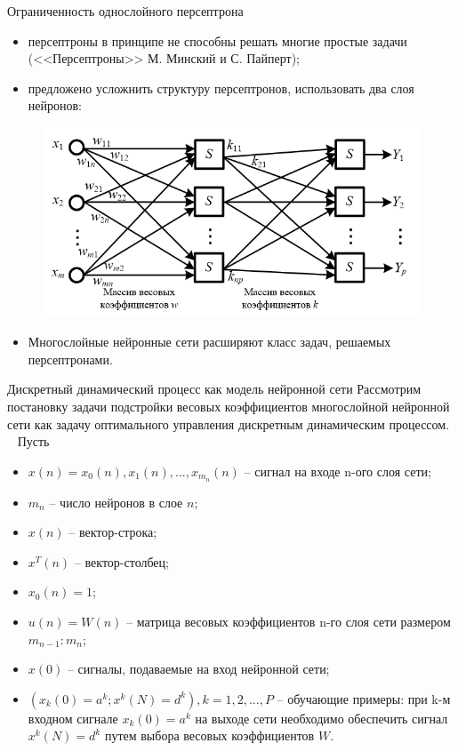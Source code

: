 \documentclass{beamer}
\begin{document}
\begin{frame}[t]{Ограниченность однослойного персептрона}
	\begin{itemize}
		\item персептроны в принципе не способны решать многие простые задачи (<<Персептроны>> М. Минский и С. Пайперт);
		\item предложено усложнить структуру персептронов, использовать два слоя нейронов: 
	\end{itemize}		
	\begin{figure}[h]
		\centering
		\includegraphics[scale=0.5]{images/lec03-twolayer.png}
	\end{figure}		
	\begin{itemize}	
		\item Многослойные нейронные сети расширяют класс задач, решаемых персептронами. 
	\end{itemize}
\end{frame}

\begin{frame}[t]{Дискретный динамический процесс как модель нейронной сети}
	Рассмотрим постановку задачи подстройки весовых коэффициентов многослойной нейронной сети как задачу оптимального управления дискретным динамическим процессом.
	~
	Пусть 
	\begin{itemize}
		\item $x(n)={x_0(n), x_1(n),...,x_{m_n}(n)} $ -- сигнал на входе n-ого слоя сети;
		\item $m_n$ -- число нейронов в слое $n$;
		\item $x(n) $ -- вектор-строка;
		\item $x^T(n) $ -- вектор-столбец;
		\item $x_0(n)=1$;
		\item $u(n)=W(n)$ -- матрица весовых коэффициентов n-го слоя сети размером $m_{n-1}:m_n$;			
		\item $x(0)$ -- сигналы, подаваемые на вход нейронной сети;
		\item $(x_k(0)=a^k; x^k(N)=d^k), k=1,2,...,P $ -- обучающие примеры: при k-м входном сигнале $x_k(0)=a^k$ на выходе сети необходимо обеспечить сигнал $x^k(N)=d^k$ путем выбора весовых коэффициентов $W$.
	\end{itemize}
\end{frame}
\end{document}
